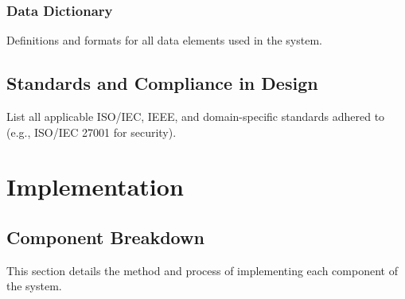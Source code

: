 \documentclass[11pt,a4paper]{report}
\begin{document}
\subsection{Data Dictionary}
Definitions and formats for all data elements used in the system.


\section{Standards and Compliance in Design}
List all applicable ISO/IEC, IEEE, and domain-specific standards adhered to (e.g., ISO/IEC 27001 for security).

\chapter{Implementation}
\label{chap:implement}

\section{Component Breakdown}
This section details the method and process of implementing each component of the system.
\end{document}
